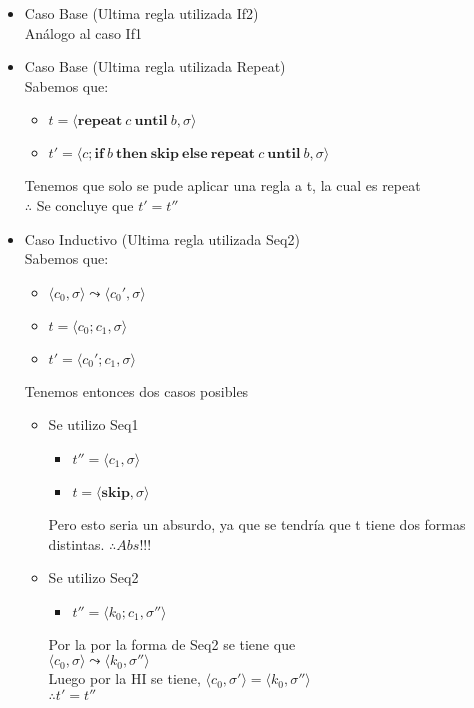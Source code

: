 \documentclass[12pt, titlepage]{article}
\renewcommand{\skip}{\textbf{skip}}
\newcommand{\until}{\textbf{until}}
\begin{document}
\begin{itemize}[label=$\bullet$]
\item {Caso Base (Ultima regla utilizada If2)}
    \\Análogo al caso If1

\item {Caso Base (Ultima regla utilizada Repeat)}
    \\Sabemos que:
    \begin{itemize}[label=$\bullet$]
        \item {$t = \langle \textbf{repeat} \:c \:\until \:b, \sigma \rangle$}
        \item {$t' = \langle c; \textbf{if} \:b \:\textbf{then} \:\skip \:\textbf{else} \:\textbf{repeat} \:c \:\until \:b, \sigma\rangle$}
    \end{itemize}
    Tenemos que solo se pude aplicar una regla a t, la cual es repeat
    \\$\therefore$ Se concluye que $t'= t''$

\item {Caso Inductivo (Ultima regla utilizada Seq2)}
    \\Sabemos que:
    \begin{itemize}[label=$\bullet$]
        \item {$\langle c_0, \sigma \rangle \leadsto \langle c_0', \sigma \rangle$}
        \item {$t = \langle c_0;c_1, \sigma \rangle $}
        \item {$t' = \langle c_0';c_1, \sigma  \rangle$}
    \end{itemize}

    Tenemos entonces dos casos posibles
    \begin{itemize}[label=$\bullet$]
        \item {Se utilizo Seq1}
            \begin{itemize}[label=$\bullet$]
                \item {$t'' =\langle c_1, \sigma \rangle$}
                \item {$t = \langle \skip, \sigma \rangle$}
            \end{itemize}
                Pero esto seria un absurdo, ya que se tendría que t tiene dos formas distintas.
                $\therefore Abs!!!$

        \item {Se utilizo Seq2}
            \begin{itemize}[label=$\bullet$]
                \item {$t'' =\langle k_0;c_1, \sigma'' \rangle$}
            \end{itemize}
            Por la por la forma de Seq2 se tiene que
            \\$\langle c_0, \sigma \rangle \leadsto \langle k_0, \sigma'' \rangle$
            \\Luego por la HI se tiene,
            $\langle c_0, \sigma' \rangle = \langle k_0, \sigma'' \rangle$
            \\$\therefore t'=t''$
    \end{itemize}
\end{itemize}
\end{document}
